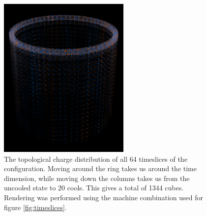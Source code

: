 \begin{figure}
\centering
{}
\includegraphics[width=\textwidth]{torus0032.png}

\caption{The topological charge distribution of all 64 timeslices of the configuration. Moving around the ring takes us around the time dimension, while moving down the columns takes us from the uncooled state to 20 cools. This gives a total of 1344 cubes. Rendering was performed using the machine combination used for figure \ref{fig:timeslices}.}
\label{fig:tall-ring}
\end{figure}
